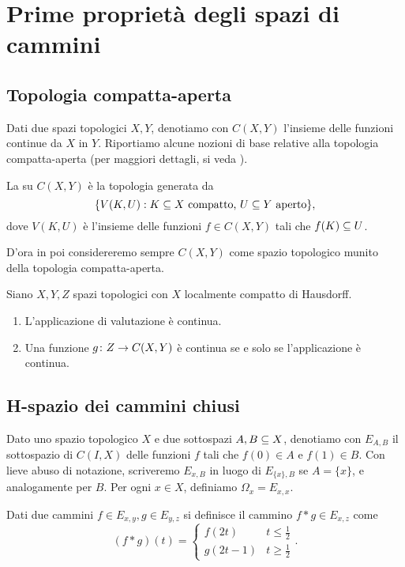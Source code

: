 \section{Prime proprietà degli spazi di cammini}
\subsection{Topologia compatta-aperta}
Dati due spazi topologici $X,Y$, denotiamo con $C(X,Y)$ l'insieme delle funzioni continue da $X$ in $Y$. Riportiamo alcune nozioni di base relative alla topologia compatta-aperta (per maggiori dettagli, si veda ).
\begin{definition}
La  su $C(X,Y)$ è la topologia generata da 
$$
\{V(K,U):\text{$K\subseteq X$ compatto, $U\subseteq Y$ aperto}\},
$$
dove $V(K,U)$ è l'insieme delle funzioni $f\in C(X,Y)$ tali che $f(K)\subseteq U$.
\end{definition}
D'ora in poi considereremo sempre $C(X,Y)$ come spazio topologico munito della topologia compatta-aperta.
\begin{proposition}
Siano $X,Y,Z$ spazi topologici con $X$ localmente compatto di Hausdorff.
\begin{enumerate}
\item L'applicazione di valutazione
è continua.
\item Una funzione $\map{g}{Z}{C(X,Y)}$ è continua se e solo se l'applicazione
è continua.
\end{enumerate}
\end{proposition}

\subsection{H-spazio dei cammini chiusi}

Dato uno spazio topologico $X$ e due sottospazi $A,B\subseteq X$, denotiamo con $E_{A,B}$ il sottospazio di $C(I,X)$ delle funzioni $f$ tali che $f(0)\in A$ e $f(1)\in B$. Con lieve abuso di notazione, scriveremo $E_{x,B}$ in luogo di $E_{\{x\},B}$ se $A=\{x\}$, e analogamente per $B$. Per ogni $x\in X$, definiamo $\Omega_x=E_{x,x}$.

Dati due cammini $f\in E_{x,y},g\in E_{y,z}$ si definisce il cammino $f\ast g\in E_{x,z}$ come
$$
(f\ast g)(t)=
\begin{cases}
f(2t)&t\le\frac{1}{2}\\
g(2t-1)&t\ge\frac{1}{2}
\end{cases}.
$$

